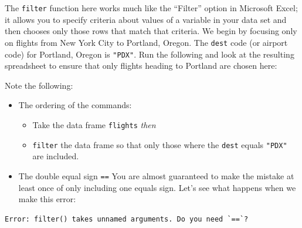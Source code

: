 \documentclass[]{tufte-book}
\newenvironment{Shaded}{\begin{snugshade}}{\end{snugshade}}
\newcommand{\KeywordTok}[1]{\textcolor[rgb]{0.13,0.29,0.53}{\textbf{{#1}}}}
\newcommand{\DataTypeTok}[1]{\textcolor[rgb]{0.13,0.29,0.53}{{#1}}}
\newcommand{\StringTok}[1]{\textcolor[rgb]{0.31,0.60,0.02}{{#1}}}
\newcommand{\NormalTok}[1]{{#1}}
\providecommand{\tightlist}{%
  \setlength{\itemsep}{0pt}\setlength{\parskip}{0pt}}
\begin{document}
The \texttt{filter} function here works much like the ``Filter'' option
in Microsoft Excel; it allows you to specify criteria about values of a
variable in your data set and then chooses only those rows that match
that criteria. We begin by focusing only on flights from New York City
to Portland, Oregon. The \texttt{dest} code (or airport code) for
Portland, Oregon is \texttt{"PDX"}. Run the following and look at the
resulting spreadsheet to ensure that only flights heading to Portland
are chosen here:

\begin{Shaded}
\end{Shaded}

Note the following:

\begin{itemize}
\tightlist
\item
  The ordering of the commands:

  \begin{itemize}
  \tightlist
  \item
    Take the data frame \texttt{flights} \emph{then}
  \item
    \texttt{filter} the data frame so that only those where the
    \texttt{dest} equals \texttt{"PDX"} are included.
  \end{itemize}
\item
  The double equal sign \texttt{==} You are almost guaranteed to make
  the mistake at least once of only including one equals sign. Let's see
  what happens when we make this error:
\end{itemize}

\begin{Shaded}
\end{Shaded}

\begin{verbatim}
Error: filter() takes unnamed arguments. Do you need `==`?
\end{verbatim}
\end{document}

